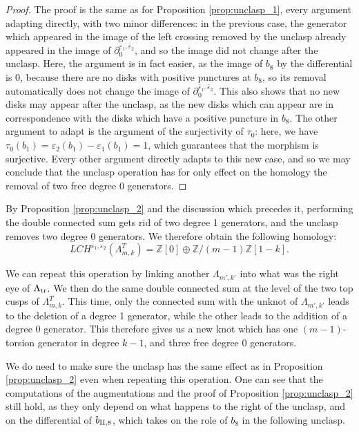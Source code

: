 \documentclass[11pt]{amsart}
\theoremstyle{plain}
\theoremstyle{remark}
\numberwithin{equation}{section}
\newcommand{\Z}{\ensuremath{\mathbb{Z}}}
\begin{document}
\begin{proof}
The proof is the same as for Proposition \ref{prop:unclasp_1}, every argument adapting directly, with two minor differences: in the previous case, the generator which appeared in the image of the left crossing removed by the unclasp already appeared in the image of $\partial_0^{\bar\varepsilon_1,\bar\varepsilon_2}$, and so the image did not change after the unclasp. Here, the argument is in fact easier, as the image of $b_8$ by the differential is 0, because there are no disks with positive punctures at $b_8$, so its removal automatically does not change the image of $\partial_0^{\bar\varepsilon_1,\bar\varepsilon_2}$. This also shows that no new disks may appear after the unclasp, as the new disks which can appear are in correspondence with the disks which have a positive puncture in $b_8$. The other argument to adapt is the argument of the surjectivity of $\tau_0$: here, we have $\tau_0(b_1)=\varepsilon_2(b_1)-\varepsilon_1(b_1)=1$, which guarantees that the morphism is surjective. Every other argument directly adapts to this new case, and so we may conclude that the unclasp operation has for only effect on the homology the removal of two free degree 0 generators.
\end{proof}

By Proposition \ref{prop:unclasp_2} and the discussion which precedes it, performing the double connected sum gets rid of two degree 1 generators, and the unclasp removes two degree 0 generators. We therefore obtain the following homology: 
$$
LCH^{\varepsilon_1, \varepsilon_2}(\Lambda^T_{m,k}) = \Z[0] \oplus \Z/(m-1)\Z[1-k].
$$

We can repeat this operation by linking another $\Lambda_{m',k'}$ into what was the right eye of $\Lambda_{\rm tr}$. We then do the same double connected sum at the level of the two top cusps of $\Lambda^T_{m,k}$. This time, only the connected sum with the unknot of $\Lambda_{m',k'}$ leads to the deletion of a degree 1 generator, while the other leads to the addition of a degree 0 generator. This therefore gives us a new knot which has one $(m-1)$-torsion generator in degree $k-1$, and three free degree 0 generators. 

We do need to make sure the unclasp has the same effect as in Proposition \ref{prop:unclasp_2} even when repeating this operation. One can see that the computations of the augmentations and the proof of Proposition \ref{prop:unclasp_2} still hold, as they only depend on what happens to the right of the unclasp, and on the differential of $b_{\rm II,8}$, which takes on the role of $b_{8}$ in the following unclasp.
\end{document}
